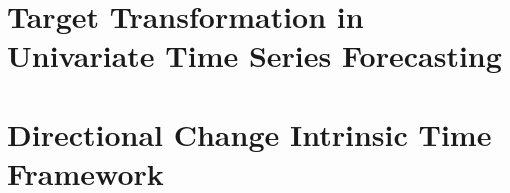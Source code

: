 \section{Target Transformation in Univariate Time Series Forecasting}


\section{Directional Change Intrinsic Time Framework}
